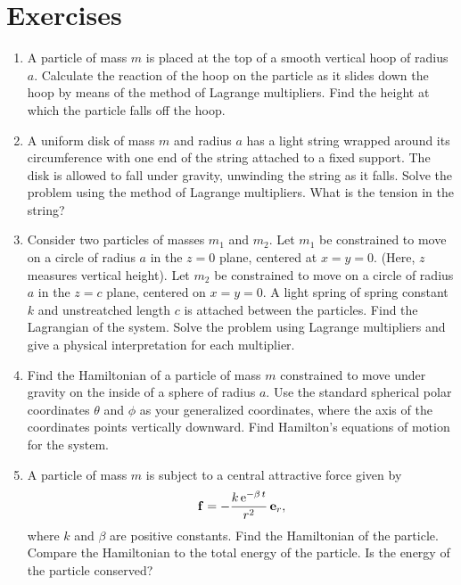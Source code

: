 \section{Exercises}
{\small
\renewcommand{\theenumi}{10.\arabic{enumi}}
\begin{enumerate}
\item A particle of mass $m$ is placed at the top of
a smooth vertical hoop of radius $a$. Calculate the reaction of the hoop on the
particle as it slides down the hoop by means of the method of Lagrange multipliers. Find the height at which the particle falls off the hoop.

\item A uniform disk of mass $m$ and radius $a$ has a light string wrapped
around its circumference with one end of the string attached to a fixed
support. The disk is allowed to fall under gravity, unwinding the string
as it falls. Solve the problem using the method of Lagrange multipliers.
What is the tension in the string?

\item Consider two particles of masses $m_1$ and $m_2$. Let $m_1$
be constrained to move on a circle of radius $a$ in the $z=0$ plane,
centered at $x=y=0$. (Here, $z$ measures vertical height). Let $m_2$
be constrained to move on a circle of radius $a$ in the $z=c$ plane,
centered on $x=y=0$. A light  spring of spring constant $k$ and unstreatched
length $c$
is attached between the particles. Find the Lagrangian of the system. Solve the
problem using Lagrange multipliers and give a physical interpretation
for each multiplier.

\item Find the Hamiltonian of a particle of mass $m$ constrained to
move under gravity on the inside of a sphere of radius $a$. 
Use the standard spherical polar coordinates $\theta$ and $\phi$ as
your generalized coordinates, where the axis of the coordinates points
vertically downward. Find Hamilton's equations of motion for the system.

\item A particle of mass $m$ is subject to a central attractive force
given by
$$
{\bf f} = - \frac{k\,{\rm e}^{-\beta\,t}}{r^2}\,{\bf e}_r,
$$
where $k$ and $\beta$ are positive constants. Find the Hamiltonian of
the particle. Compare the Hamiltonian to the total energy of the particle.
Is the energy of the particle conserved?
\end{enumerate}
}